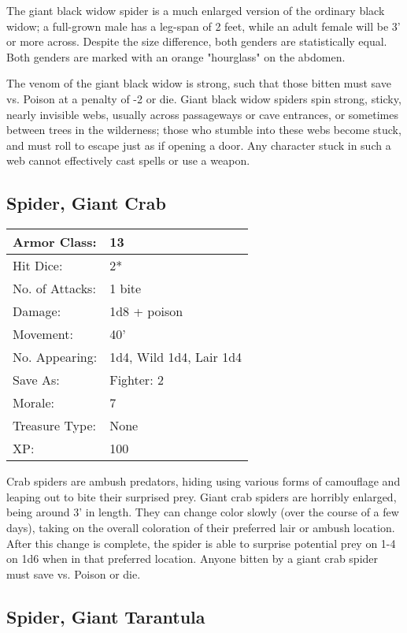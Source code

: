 \documentclass[a4paper,twoside,openany,10pt]{book}
\begin{document}
\begin{multicols}{2}
The giant black widow spider is a much enlarged version of the ordinary black widow; a full-grown male has a leg-span of 2 feet, while an adult female will be 3' or more across. Despite the size difference, both genders are statistically equal. Both genders are marked with an orange "hourglass" on the abdomen.

The venom of the giant black widow is strong, such that those bitten must save vs. Poison at a penalty of -2 or die. Giant black widow spiders spin strong, sticky, nearly invisible webs, usually across passageways or cave entrances, or sometimes between trees in the wilderness; those who stumble into these webs become stuck, and must roll to escape just as if opening a door. Any character stuck in such a web cannot effectively cast spells or use a weapon.

\subsection*{Spider, Giant Crab}\label{spider-giant-crab}

\begin{tabularx}{0.50\textwidth}{@{}lX@{}}
Armor Class: & 13 \\\hline
Hit Dice: & 2* \\\hline
No. of Attacks: & 1 bite \\\hline
Damage: & 1d8 + poison \\\hline
Movement: & 40' \\\hline
No. Appearing: & 1d4, Wild 1d4, Lair 1d4 \\\hline
Save As: & Fighter: 2 \\\hline
Morale: & 7 \\\hline
Treasure Type: & None \\\hline
XP: & 100 \\\hline
\end{tabularx}\medskip

Crab spiders are ambush predators, hiding using various forms of camouflage and leaping out to bite their surprised prey. Giant crab spiders are horribly enlarged, being around 3' in length. They can change color slowly (over the course of a few days), taking on the overall coloration of their preferred lair or ambush location. After this change is complete, the spider is able to surprise potential prey on 1-4 on 1d6 when in that preferred location. Anyone bitten by a giant crab spider must save vs. Poison or die. 


\subsection*{Spider, Giant Tarantula}\label{spider-giant-tarantula}


\end{multicols}
\end{document}
